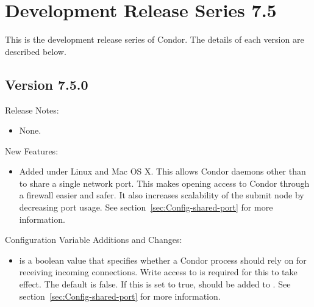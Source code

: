 
\section{\label{sec:History-7-5}Development Release Series 7.5}

This is the development release series of Condor.
The details of each version are described below.

\subsection*{\label{sec:New-7-5-0}Version 7.5.0}

\noindent Release Notes:

\begin{itemize}

\item None.

\end{itemize}


\noindent New Features:

\begin{itemize}

\item Added  under Linux and Mac OS X.  This
  allows Condor daemons other than  to share a
  single network port.  This makes opening access to Condor through a
  firewall easier and safer.  It also increases scalability of the
  submit node by decreasing port usage. See
  section~\ref{sec:Config-shared-port} for more information.

\end{itemize}

\noindent Configuration Variable Additions and Changes:

\begin{itemize}

\item {} is a boolean value that specifies
  whether a Condor process should rely on  for
  receiving incoming connections.  Write access to
   is required for this to take effect.
  The default is false.  If this is set to true, 
  should be added to .  See
  section~\ref{sec:Config-shared-port} for more information.


\end{itemize}

